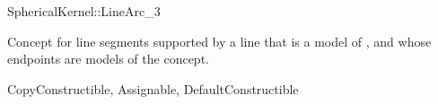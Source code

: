 \begin{ccRefConcept}{SphericalKernel::LineArc_3}

\ccDefinition

Concept for line segments supported by a line that is a model of
, and whose endpoints are models of the
 concept. 

\ccRefines
CopyConstructible, Assignable, DefaultConstructible

\ccHasModels
{}

\end{ccRefConcept}
